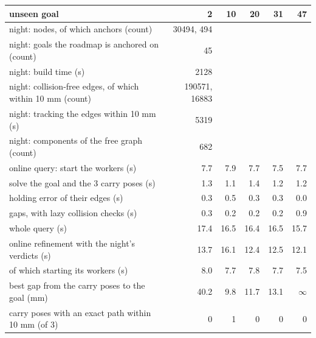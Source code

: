 \begin{tabular}{@{}>{\raggedright\arraybackslash}p{6.4cm} rrrrr@{}}
\toprule
unseen goal & 2 & 10 & 20 & 31 & 47 \\
\midrule
night: nodes, of which anchors (count) & 30494, 494 &  &  &  &  \\
night: goals the roadmap is anchored on (count) & 45 &  &  &  &  \\
night: build time (s) & 2128 &  &  &  &  \\
night: collision-free edges, of which within 10 mm (count) & 190571, 16883 &  &  &  &  \\
night: tracking the edges within 10 mm (s) & 5319 &  &  &  &  \\
night: components of the free graph (count) & 682 &  &  &  &  \\
\midrule
online query: start the workers (s) & 7.7 & 7.9 & 7.7 & 7.5 & 7.7 \\
\quad solve the goal and the 3 carry poses (s) & 1.3 & 1.1 & 1.4 & 1.2 & 1.2 \\
\quad holding error of their edges (s) & 0.3 & 0.5 & 0.3 & 0.3 & 0.0 \\
\quad gaps, with lazy collision checks (s) & 0.3 & 0.2 & 0.2 & 0.2 & 0.9 \\
\quad whole query (s) & 17.4 & 16.5 & 16.4 & 16.5 & 15.7 \\
online refinement with the night's verdicts (s) & 13.7 & 16.1 & 12.4 & 12.5 & 12.1 \\
\quad of which starting its workers (s) & 8.0 & 7.7 & 7.8 & 7.7 & 7.5 \\
\midrule
best gap from the carry poses to the goal (mm) & 40.2 & 9.8 & 11.7 & 13.1 & $\infty$ \\
carry poses with an exact path within 10 mm (of 3) & 0 & 1 & 0 & 0 & 0 \\
\bottomrule
\end{tabular}
